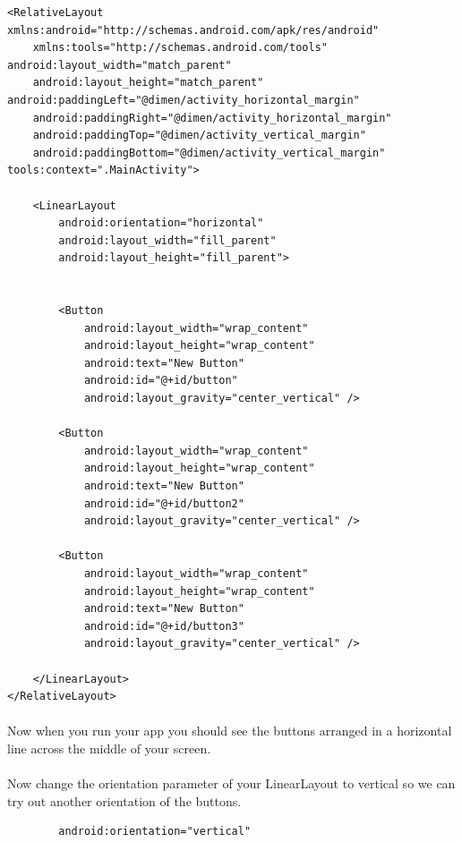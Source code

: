 \documentclass[12pt, a4paper, twoside]{book}
\begin{document}
\begin{lstlisting}
<RelativeLayout xmlns:android="http://schemas.android.com/apk/res/android"
    xmlns:tools="http://schemas.android.com/tools" android:layout_width="match_parent"
    android:layout_height="match_parent" android:paddingLeft="@dimen/activity_horizontal_margin"
    android:paddingRight="@dimen/activity_horizontal_margin"
    android:paddingTop="@dimen/activity_vertical_margin"
    android:paddingBottom="@dimen/activity_vertical_margin" tools:context=".MainActivity">

    <LinearLayout
        android:orientation="horizontal"
        android:layout_width="fill_parent"
        android:layout_height="fill_parent">


        <Button
            android:layout_width="wrap_content"
            android:layout_height="wrap_content"
            android:text="New Button"
            android:id="@+id/button"
            android:layout_gravity="center_vertical" />

        <Button
            android:layout_width="wrap_content"
            android:layout_height="wrap_content"
            android:text="New Button"
            android:id="@+id/button2"
            android:layout_gravity="center_vertical" />

        <Button
            android:layout_width="wrap_content"
            android:layout_height="wrap_content"
            android:text="New Button"
            android:id="@+id/button3"
            android:layout_gravity="center_vertical" />

    </LinearLayout>
</RelativeLayout>

\end{lstlisting}

\paragraph{} Now when you run your app you should see the buttons arranged in a horizontal line across the middle of your screen.

\paragraph{} Now change the orientation parameter of your LinearLayout to vertical so we can try out another orientation of the buttons. 

\begin{lstlisting}
        android:orientation="vertical"
\end{lstlisting}
\end{document}
